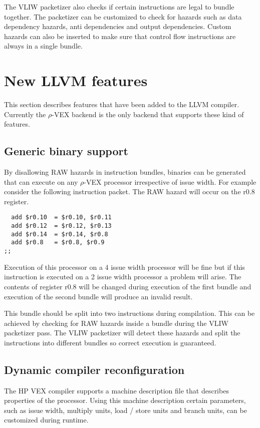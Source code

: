 The VLIW packetizer also checks if certain instructions are legal to bundle together. The packetizer can be customized to check for hazards such as data dependency hazards, anti dependencies and output dependencies. Custom hazards can also be inserted to make sure that control flow instructions are always in a single bundle.

\section{New LLVM features}
This section describes features that have been added to the LLVM compiler. Currently the $\rho$-VEX backend is the only backend that supports these kind of features.

\subsection{Generic binary support}
By disallowing RAW hazards in instruction bundles, binaries can be generated that can execute on any $\rho$-VEX processor irrespective of issue width. For example consider the following instruction packet. The RAW hazard will occur on the r0.8 register.

\begin{lstlisting}
  add $r0.10  = $r0.10, $r0.11
  add $r0.12  = $r0.12, $r0.13
  add $r0.14  = $r0.14, $r0.8
  add $r0.8   = $r0.8, $r0.9
;; 
\end{lstlisting}

Execution of this processor on a 4 issue width processor will be fine but if this instruction is executed on a 2 issue width processor a problem will arise. The contents of register r0.8 will be changed during execution of the first bundle and execution of the second bundle will produce an invalid result.

This bundle should be split into two instructions during compilation. This can be achieved by checking for RAW hazards inside a bundle during the VLIW packetizer pass. The VLIW packetizer will detect these hazards and split the instructions into different bundles so correct execution is guaranteed.

\subsection{Dynamic compiler reconfiguration}
The HP VEX compiler supports a machine description file that describes properties of the processor. Using this machine description certain parameters, such as issue width, multiply units, load / store units and branch units, can be customized during runtime. 

